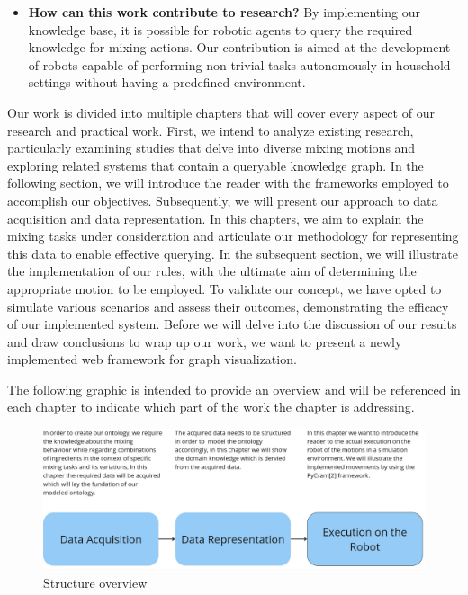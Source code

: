 \begin{itemize}
    \item \textbf{How can this work contribute to research?} By implementing our knowledge base, it is possible for robotic agents to query the required knowledge for mixing actions. Our contribution is aimed at the development of robots capable of performing non-trivial tasks autonomously in household settings without having a predefined environment.
\end{itemize}


Our work is divided into multiple chapters that will cover every aspect of our research and practical work.
First, we intend to analyze existing research, particularly examining studies that delve into diverse mixing motions and exploring related systems that contain a queryable knowledge graph.
In the following section, we will introduce the reader with the frameworks employed to accomplish our objectives.	
Subsequently, we will present our approach to data acquisition and data representation.
In this chapters, we aim to explain the mixing tasks under consideration and articulate our methodology for representing this data to enable effective querying.
In the subsequent section, we will illustrate the implementation of our rules, with the ultimate aim of determining the appropriate motion to be employed.
To validate our concept, we have opted to simulate various scenarios and assess their outcomes, demonstrating the efficacy of our implemented system.
Before we will delve into the discussion of our results and draw conclusions to wrap up our work, we want to present a newly implemented web framework for graph visualization.

The following graphic is intended to provide an overview and will be referenced in each chapter to indicate which part of the work the chapter is addressing.
\begin{figure}[H]
    \includegraphics[scale=0.25]{Graphics/structure_overview.jpg}
    \caption{Structure overview}
\end{figure}